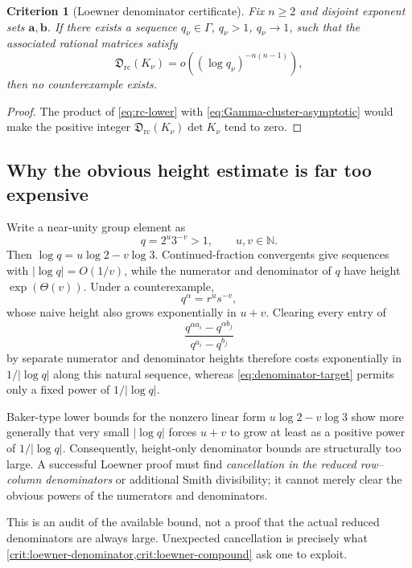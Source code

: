\documentclass[11pt,oneside]{article}
\newtheorem{criterion}[theorem]{Criterion}
\theoremstyle{definition}
\theoremstyle{remark}
\newcommand{\N}{\mathbb{N}}
\newcommand{\abs}[1]{\left\lvert #1\right\rvert}
\begin{document}
\begin{criterion}[Loewner denominator certificate]
\label{crit:loewner-denominator}
Fix $n\ge2$ and disjoint exponent sets $\bm a,\bm b$.  If there exists a sequence $q_\nu\in\Gamma$, $q_\nu>1$, $q_\nu\to1$, such that the associated rational matrices satisfy
\begin{equation}
 \mathfrak D_{\mathrm{rc}}(K_\nu)
 =o\left((\log q_\nu)^{-n(n-1)}\right),
 \label{eq:denominator-target}
\end{equation}
then no counterexample exists.
\end{criterion}

\begin{proof}
The product of \eqref{eq:rc-lower} with \eqref{eq:Gamma-cluster-asymptotic} would make the positive integer
$\mathfrak D_{\mathrm{rc}}(K_\nu)\det K_\nu$ tend to zero.
\end{proof}

\subsection{Why the obvious height estimate is far too expensive}

Write a near-unity group element as
\[
 q=2^u3^{-v}>1,
 \qquad u,v\in\N.
\]
Then $\log q=u\log2-v\log3$.  Continued-fraction convergents give sequences with $\abs{\log q}=O(1/v)$, while the numerator and denominator of $q$ have height $\exp(\Theta(v))$.  Under a counterexample,
\[
 q^\alpha=r^u s^{-v},
\]
whose naive height also grows exponentially in $u+v$.  Clearing every entry of
\[
 \frac{q^{\alpha a_i}-q^{\alpha b_j}}{q^{a_i}-q^{b_j}}
\]
by separate numerator and denominator heights therefore costs exponentially in $1/\abs{\log q}$ along this natural sequence, whereas \eqref{eq:denominator-target} permits only a fixed power of $1/\abs{\log q}$.

Baker-type lower bounds for the nonzero linear form $u\log2-v\log3$ show more generally that very small $\abs{\log q}$ forces $u+v$ to grow at least as a positive power of $1/\abs{\log q}$.  Consequently, height-only denominator bounds are structurally too large.  A successful Loewner proof must find \emph{cancellation in the reduced row--column denominators} or additional Smith divisibility; it cannot merely clear the obvious powers of the numerators and denominators.

\begin{auditbox}
This is an audit of the available bound, not a proof that the actual reduced denominators are always large.  Unexpected cancellation is precisely what \cref{crit:loewner-denominator,crit:loewner-compound} ask one to exploit.
\end{auditbox}
\end{document}
